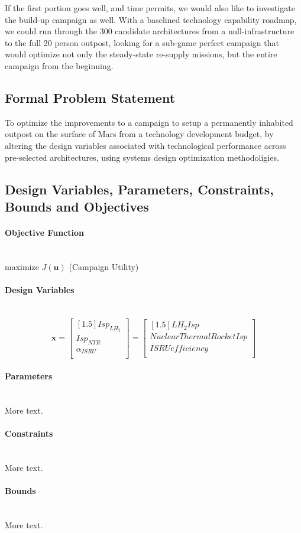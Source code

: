 \documentclass[11pt]{article} %
\newcommand{\myparagraph}[1]{\paragraph{#1}\mbox{}\\}
\begin{document}
If the first portion goes well, and time permits, we would also like to investigate the build-up campaign as well.  With a baselined technology capability roadmap, we could run through the 300 candidate architectures from a null-infrastructure to the full 20 person outpost, looking for a sub-game perfect campaign that would optimize not only the steady-state re-supply missions, but the entire campaign from the beginning.

\subsection{Formal Problem Statement}
To optimize the improvements to a campaign to setup a permanently inhabited outpost on the surface of Mars from a technology development budget, by altering the design variables associated with technological performance across pre-selected architectures, using systems design optimization methodoligies. 
\subsection{Design Variables, Parameters, Constraints, Bounds and Objectives}


\myparagraph{Objective Function}

maximize $J(\mathbf{u})$ (Campaign Utility)

\myparagraph{Design Variables}
\begin{equation*}
\mathbf{x}=
\begin{bmatrix}[1.5]
Isp_{LH_2}\\
Isp_{NTR}\\
\alpha_{ISRU}\\
\end{bmatrix}
=
\begin{bmatrix}[1.5]
LH_2 Isp\\
Nuclear Thermal Rocket Isp\\
ISRU efficiency\\

\end{bmatrix}
\end{equation*}



\myparagraph{Parameters}

More text.

\myparagraph{Constraints}

More text.

\myparagraph{Bounds}

More text.
\end{document}
